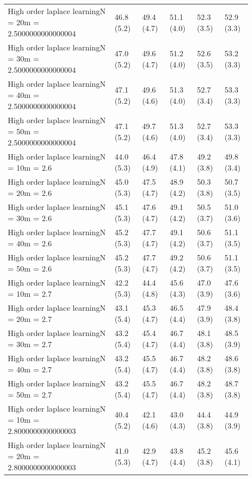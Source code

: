 \documentclass{article}
\begin{document}
\begin{table*}[t!]
\begin{center}
\begin{small}
\begin{sc}
\begin{tabular}{llllll}
High order laplace learningN = 20m = 2.5000000000000004&46.8 (5.2)      &49.4 (4.7)      &51.1 (4.0)      &52.3 (3.5)      &52.9 (3.3)      \\
High order laplace learningN = 30m = 2.5000000000000004&47.0 (5.2)      &49.6 (4.7)      &51.2 (4.0)      &52.6 (3.5)      &53.2 (3.3)      \\
High order laplace learningN = 40m = 2.5000000000000004&47.1 (5.2)      &49.6 (4.6)      &51.3 (4.0)      &52.7 (3.4)      &53.3 (3.3)      \\
High order laplace learningN = 50m = 2.5000000000000004&47.1 (5.2)      &49.7 (4.6)      &51.3 (4.0)      &52.7 (3.4)      &53.3 (3.3)      \\
High order laplace learningN = 10m = 2.6&44.0 (5.3)      &46.4 (4.9)      &47.8 (4.1)      &49.2 (3.8)      &49.8 (3.4)      \\
High order laplace learningN = 20m = 2.6&45.0 (5.3)      &47.5 (4.7)      &48.9 (4.2)      &50.3 (3.8)      &50.7 (3.5)      \\
High order laplace learningN = 30m = 2.6&45.1 (5.3)      &47.6 (4.7)      &49.1 (4.2)      &50.5 (3.7)      &51.0 (3.6)      \\
High order laplace learningN = 40m = 2.6&45.2 (5.3)      &47.7 (4.7)      &49.1 (4.2)      &50.6 (3.7)      &51.1 (3.5)      \\
High order laplace learningN = 50m = 2.6&45.2 (5.3)      &47.7 (4.7)      &49.2 (4.2)      &50.6 (3.7)      &51.1 (3.5)      \\
High order laplace learningN = 10m = 2.7&42.2 (5.3)      &44.4 (4.8)      &45.6 (4.3)      &47.0 (3.9)      &47.6 (3.6)      \\
High order laplace learningN = 20m = 2.7&43.1 (5.4)      &45.3 (4.7)      &46.5 (4.4)      &47.9 (3.9)      &48.4 (3.8)      \\
High order laplace learningN = 30m = 2.7&43.2 (5.4)      &45.4 (4.7)      &46.7 (4.4)      &48.1 (3.8)      &48.5 (3.9)      \\
High order laplace learningN = 40m = 2.7&43.2 (5.4)      &45.5 (4.7)      &46.7 (4.4)      &48.2 (3.8)      &48.6 (3.8)      \\
High order laplace learningN = 50m = 2.7&43.2 (5.4)      &45.5 (4.7)      &46.7 (4.4)      &48.2 (3.8)      &48.7 (3.8)      \\
High order laplace learningN = 10m = 2.8000000000000003&40.4 (5.2)      &42.1 (4.6)      &43.0 (4.3)      &44.4 (3.8)      &44.9 (3.9)      \\
High order laplace learningN = 20m = 2.8000000000000003&41.0 (5.3)      &42.9 (4.7)      &43.8 (4.4)      &45.2 (3.8)      &45.6 (4.1)      \\

\end{tabular}
\end{sc}
\end{small}
\end{center}
\end{table*}
\end{document}
